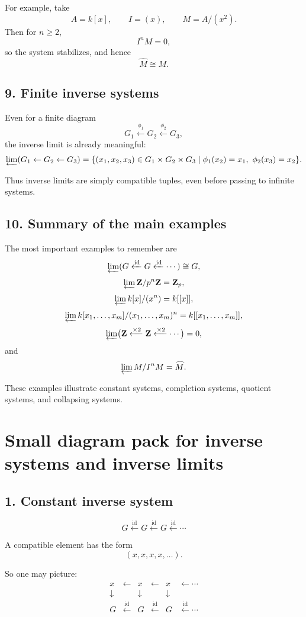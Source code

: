 \documentclass[12pt,a4paper]{article}
\theoremstyle{plain}
\theoremstyle{definition}      %
\begin{document}
	For example, take
	\[
	A=k[x],\qquad I=(x),\qquad M=A/(x^2).
	\]
	Then for \(n\ge2\),
	\[
	I^nM=0,
	\]
	so the system stabilizes, and hence
	\[
	\widehat M\cong M.
	\]
	
	\subsection*{9. Finite inverse systems}
	
	Even for a finite diagram
	\[
	G_1 \xleftarrow{\phi_1} G_2 \xleftarrow{\phi_2} G_3,
	\]
	the inverse limit is already meaningful:
	\[
	\varprojlim (G_1 \xleftarrow{} G_2 \xleftarrow{} G_3)
	=
	\{(x_1,x_2,x_3)\in G_1\times G_2\times G_3
	\mid \phi_1(x_2)=x_1,\ \phi_2(x_3)=x_2\}.
	\]
	
	Thus inverse limits are simply compatible tuples, even before passing to infinite systems.
	
	\subsection*{10. Summary of the main examples}
	
	The most important examples to remember are
	\[
	\varprojlim(G \xleftarrow{\mathrm{id}} G \xleftarrow{\mathrm{id}} \cdots)\cong G,
	\]
	\[
	\varprojlim \mathbf Z/p^n\mathbf Z = \mathbf Z_p,
	\]
	\[
	\varprojlim k[x]/(x^n)=k[[x]],
	\]
	\[
	\varprojlim k[x_1,\dots,x_m]/(x_1,\dots,x_m)^n
	=
	k[[x_1,\dots,x_m]],
	\]
	\[
	\varprojlim\bigl(\mathbf Z \xleftarrow{\times 2}\mathbf Z \xleftarrow{\times 2}\cdots\bigr)=0,
	\]
	and
	\[
	\varprojlim M/I^nM=\widehat M.
	\]
	
	These examples illustrate constant systems, completion systems, quotient systems, and collapsing systems.
	
	\section*{Small diagram pack for inverse systems and inverse limits}
	
	\subsection*{1. Constant inverse system}
	
	\[
	G \xleftarrow{\mathrm{id}} G \xleftarrow{\mathrm{id}} G \xleftarrow{\mathrm{id}} \cdots
	\]
	
	A compatible element has the form
	\[
	(x,x,x,x,\dots).
	\]
	
	So one may picture:
	\[
	\begin{array}{cccccc}
		x & \leftarrow & x & \leftarrow & x & \leftarrow \cdots \\
		\downarrow & & \downarrow & & \downarrow \\
		G & \xleftarrow{\mathrm{id}} & G & \xleftarrow{\mathrm{id}} & G & \xleftarrow{\mathrm{id}} \cdots
	\end{array}
	\]
	
\end{document}
